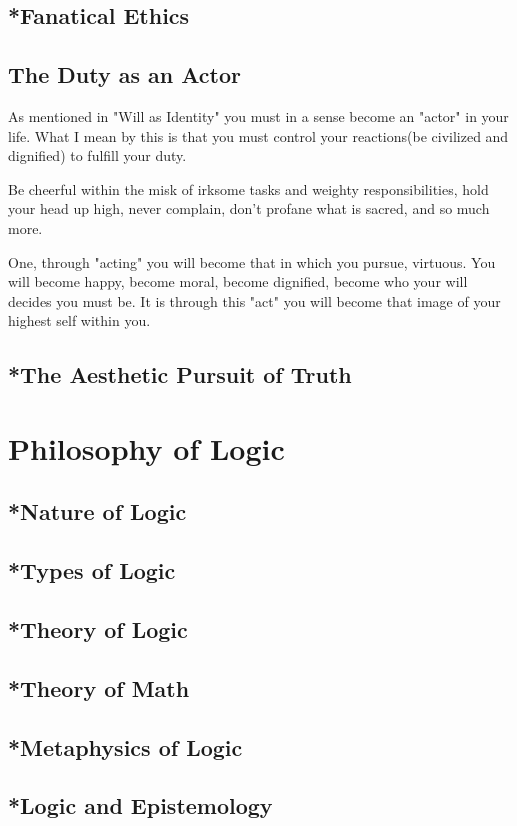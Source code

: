 \section{*Fanatical Ethics}
\section{The Duty as an Actor}
\par As mentioned in "Will as Identity" you must in a sense become an "actor" in your life. What I mean by this is that you must control your reactions(be civilized and dignified) to fulfill your duty. 
\par Be cheerful within the misk of irksome tasks and weighty responsibilities, hold your head up high, never complain, don't profane what is sacred, and so much more. 
\par One, through "acting" you will become that in which you pursue, virtuous. You will become happy, become moral, become dignified, become who your will decides you must be. It is through this "act" you will become that image of your highest self within you. 
\section{*The Aesthetic Pursuit of Truth}

\chapter{Philosophy of Logic}
\section{*Nature of Logic}
\section{*Types of Logic}
\section{*Theory of Logic}
\section{*Theory of Math}
\section{*Metaphysics of Logic}
\section{*Logic and Epistemology}


